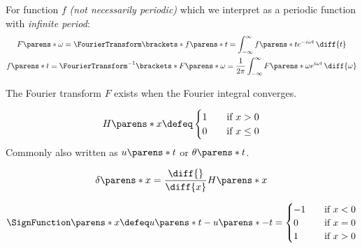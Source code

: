\begin{multicols}{2}

    \begin{CheatsheetEntryFrame}


        For function $f$ \emph{(not necessarily periodic)} which we interpret as a periodic function with \emph{infinite period}:
        \begin{gather*}
            F\parens*{\omega}
            = \FourierTransform\brackets*{f\parens*{t}}
            = \int_{-\infty}^\infty f\parens*{t} e^{-i \omega t} \,\diff{t}
            \\
            f\parens*{t}
            = \FourierTransform^{-1}\brackets*{F\parens*{\omega}}
            = \frac{1}{2 \pi}
            \int_{-\infty}^\infty F\parens*{\omega} e^{i \omega t} \,\diff{\omega}
        \end{gather*}

        The Fourier transform $F$ exists when the Fourier integral converges.

    \end{CheatsheetEntryFrame}

    \begin{CheatsheetEntryFrame}

        \begin{equation*}
            H\parens*{x}
            \defeq
                \begin{cases}
                    1 &\quad \text{if } x > 0 \\
                    0 &\quad \text{if } x \le 0
                \end{cases}
        \end{equation*}
        Commonly also written as $u\parens*{t}$ or $\theta\parens*{t}$.

        \begin{equation*}
            \delta\parens*{x}
            = \frac{\diff{}}{\diff{x}} H\parens*{x}
        \end{equation*}

    \end{CheatsheetEntryFrame}

    \begin{CheatsheetEntryFrame}

        \begin{equation*}
            \SignFunction\parens*{x}
            \defeq
            u\parens*{t} - u\parens*{-t}
            =
            \begin{cases}
                -1 &\quad \text{if } x < 0 \\
                0  &\quad \text{if } x = 0 \\
                1  &\quad \text{if } x > 0
            \end{cases}
        \end{equation*}


\end{CheatsheetEntryFrame}
\end{multicols}
